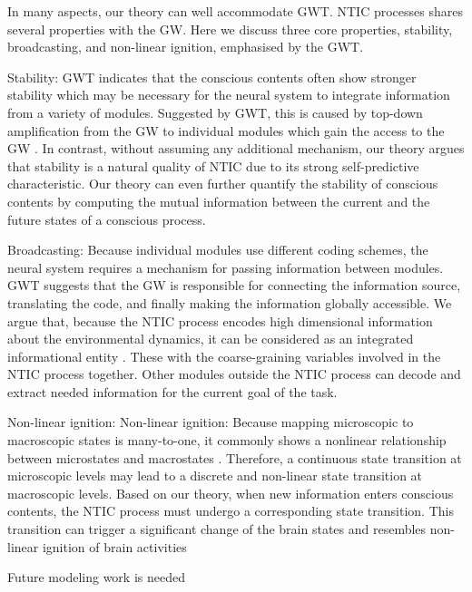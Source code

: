 \documentclass[utf8]{article}
\begin{document}
		In many aspects, our theory can well accommodate GWT. NTIC processes shares several properties with the GW. Here we discuss three core properties, stability, broadcasting, and non-linear ignition, emphasised by the GWT. 

		Stability: GWT indicates that the conscious contents often show stronger stability which may be necessary for the neural system to integrate information from a variety of modules. Suggested by GWT, this is caused by top-down amplification from the GW to individual modules which gain the access to the GW \needref{}. In contrast, without assuming any additional mechanism, our theory argues that stability is a natural quality of NTIC due to its strong self-predictive characteristic. Our theory can even further quantify the stability of conscious contents by computing the mutual information between the current and the future states of a conscious process. 
		
		Broadcasting: Because individual modules use different coding schemes, the neural system requires a mechanism for passing information between modules. GWT suggests that the GW is responsible for connecting the information source, translating the code, and finally making the information globally accessible. We argue that, because the NTIC process encodes high dimensional information about the environmental dynamics, it can be considered as an integrated informational entity . These with the coarse-graining variables involved in the NTIC process together. Other modules outside the NTIC process can decode and extract needed information for the current goal of the task. 
        
        
        Non-linear ignition: Non-linear ignition: Because mapping microscopic to macroscopic states is many-to-one, it commonly shows a nonlinear relationship between microstates and macrostates . Therefore, a continuous state transition at microscopic levels may lead to a discrete and non-linear state transition at macroscopic levels. Based on our theory, when new information enters conscious contents, the NTIC process must undergo a corresponding state transition. This transition can trigger a significant change of the brain states and resembles non-linear ignition of brain activities
        
        
        Future modeling work is needed
\end{document}
